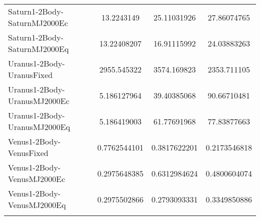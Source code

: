 \begin{table}[htbp!]
\begin{tabular}{lccc}
         Saturn1-2Body-SaturnMJ2000Ec & 13.2243149 & 25.11031926 & 27.86074765 \\
         Saturn1-2Body-SaturnMJ2000Eq & 13.22408207 & 16.91115992 & 24.03883263 \\
         Uranus1-2Body-UranusFixed & 2955.545322 & 3574.169823 & 2353.711105 \\
         Uranus1-2Body-UranusMJ2000Ec & 5.186127964 & 39.40385068 & 90.66710481 \\
         Uranus1-2Body-UranusMJ2000Eq & 5.186419003 & 61.77691968 & 77.83877663 \\
         Venus1-2Body-VenusFixed & 0.7762544101 & 0.3817622201 & 0.2173546818 \\
         Venus1-2Body-VenusMJ2000Ec & 0.2975648385 & 0.6312984624 & 0.4800604074 \\
         Venus1-2Body-VenusMJ2000Eq & 0.2975502866 & 0.2793093331 & 0.3349850886 \\
      \hline\hline
      \label{Table: WinGMAT-STK CS Parameters Set 3} 
\end{tabular}
\end{table}

